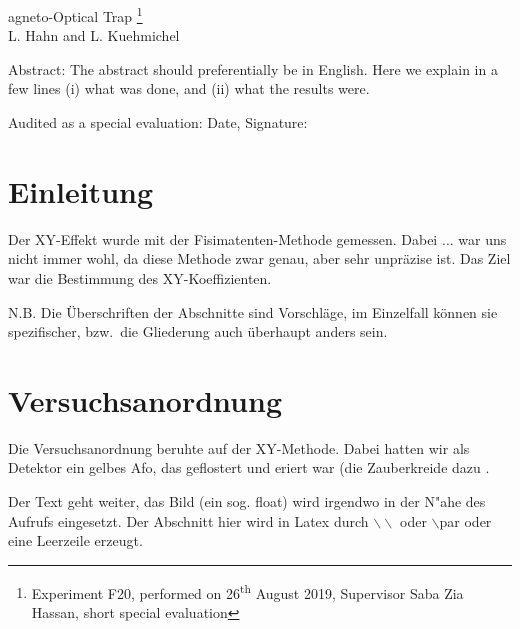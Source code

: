 \documentclass[12pt, a4paper]{article}
\begin{document}
\thispagestyle{empty}     %
\null\vspace{40mm}
\begin{center}
{%
\Large  agneto-Optical Trap
\footnote{\noindent Experiment F20, performed on 26\textsuperscript{th} August 2019,
Supervisor Saba Zia Hassan,
short special evaluation}
}\\[15mm]
L. Hahn and L. Kuehmichel

\vspace{25mm}

\parbox{0.9\textwidth}{
Abstract:    
\small The abstract should preferentially be in English. Here we explain in a
few lines (i) what was done, and (ii) what the results were.
}
\end{center}

\vfill
Audited as a special evaluation: Date, Signature:
\vspace{20mm}

\null\thispagestyle{empty} 
   

\newpage

\section{Einleitung}
Der XY-Effekt wurde mit der Fisimatenten-Methode gemessen. Dabei $\ldots$ 
war uns nicht immer wohl, da diese Methode zwar genau, aber sehr unpr\"azise 
ist. Das Ziel war die Bestimmung des XY-Koeffizienten. 

N.B. Die \"Uberschriften der Abschnitte sind Vorschl\"age, im Einzelfall 
k\"onnen sie spezifischer, bzw.\ 
die Gliederung auch \"uberhaupt anders sein.

\section{Versuchsanordnung}

Die Versuchsanordnung beruhte auf der XY-Methode. Dabei hatten wir als
Detektor ein gelbes Afo, das geflostert und eriert war \cite{afo} (die Zauberkreide dazu .

Der Text geht weiter, das Bild (ein sog. float) wird irgendwo in der N"ahe des
Aufrufs eingesetzt. Der Abschnitt hier wird in Latex durch 
$\backslash\backslash$ oder $\backslash$par
oder eine Leerzeile erzeugt.
\end{document}
